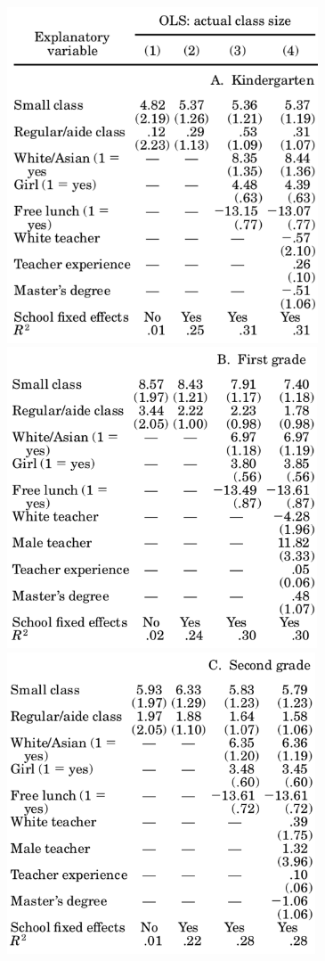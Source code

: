 \documentclass[]{book}
\begin{document}
\includegraphics[width=3.64in]{images/krueger2}
\includegraphics[width=3.62in]{images/krueger3}
\includegraphics[width=3.6in]{images/krueger4}
\end{document}
